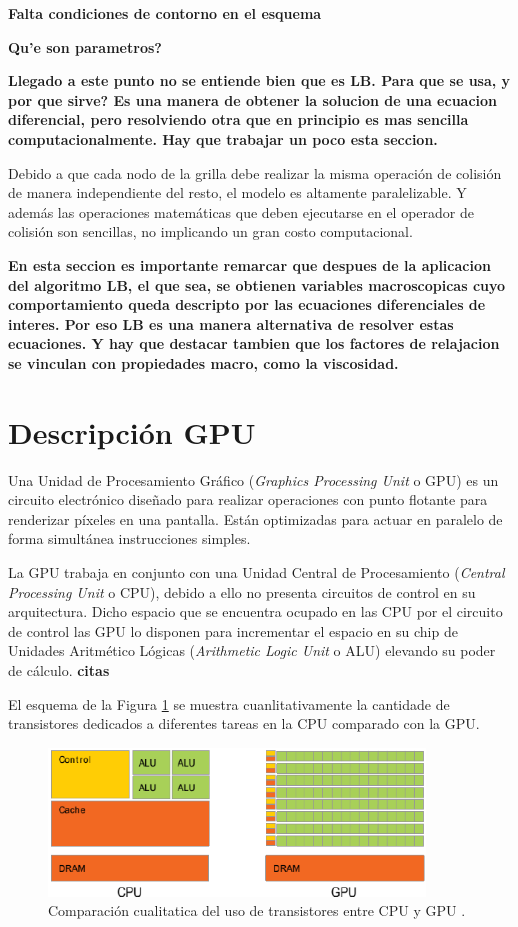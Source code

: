 \textbf{Falta condiciones de contorno en el esquema}


\textbf{Qu’e son parametros?}


\textbf{Llegado a este punto no se entiende bien que es LB. Para que se usa, y por que sirve? Es una manera de obtener la solucion de una ecuacion diferencial, pero resolviendo otra que en principio es mas sencilla computacionalmente. Hay que trabajar un poco esta seccion.}

Debido a que cada nodo de la grilla debe realizar la misma operación de colisión de manera independiente del resto, el modelo es altamente paralelizable. Y además las operaciones matemáticas que deben ejecutarse en el operador de colisión son sencillas, no implicando un gran costo computacional.

\textbf{En esta seccion es importante remarcar que despues de la aplicacion del algoritmo LB, el que sea, se obtienen variables macroscopicas cuyo comportamiento queda descripto por las ecuaciones diferenciales de interes. Por eso LB es una manera alternativa de resolver estas ecuaciones. Y hay que destacar tambien que los factores de relajacion se vinculan con propiedades macro, como la viscosidad.}

\newpage
\section{Descripción GPU}

Una Unidad de Procesamiento Gráfico (\textit{Graphics Processing Unit} o GPU) es un  circuito electrónico diseñado para realizar operaciones con punto flotante para renderizar píxeles en una pantalla. Están optimizadas para actuar en paralelo de forma simultánea instrucciones simples.

La GPU trabaja en conjunto con una Unidad Central de Procesamiento (\textit{Central Processing Unit} o CPU), debido a ello no presenta circuitos de control en su arquitectura. Dicho espacio que se encuentra ocupado en las CPU por el circuito de control las GPU lo disponen para incrementar el espacio en su chip de Unidades Aritmético Lógicas (\textit{Arithmetic Logic Unit} o ALU) elevando su poder de cálculo. \textbf{citas}

El esquema de la Figura \ref{fig:cpu_gpu_transis} se muestra cuanlitativamente la cantidade de transistores dedicados a diferentes tareas en la CPU comparado con la GPU.

\begin{figure}[h!]
	\centering
	\includegraphics[width=10cm]{cpu_gpu.png}
	\caption{Comparación cualitatica del uso de transistores entre CPU y GPU \cite{rinaldi2011modelos}.}
	\label{fig:cpu_gpu_transis}
\end{figure}

